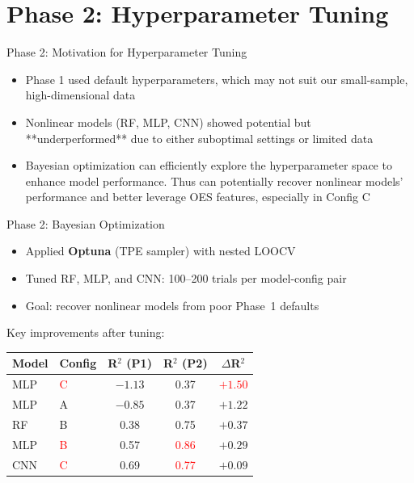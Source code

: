 \documentclass{libs/XJTLU_format}
\begin{document}
\section{Phase 2: Hyperparameter Tuning}
\begin{frame}{Phase 2: Motivation for Hyperparameter Tuning}
    \begin{itemize}
        \item Phase 1 used default hyperparameters, which may not suit our small-sample, high-dimensional data
        \item Nonlinear models (RF, MLP, CNN) showed potential but **underperformed** due to either suboptimal settings or limited data
        \item Bayesian optimization can efficiently explore the hyperparameter space to enhance model performance. Thus can potentially recover nonlinear models' performance and better leverage OES features, especially in Config C
    \end{itemize}
    
\end{frame}

\begin{frame}{Phase 2: Bayesian Optimization}
    \begin{itemize}
        \item Applied \textbf{Optuna} (TPE sampler) with nested LOOCV
        \item Tuned RF, MLP, and CNN: 100--200 trials per model-config pair
        \item Goal: recover nonlinear models from poor Phase~1 defaults
    \end{itemize}
    \vspace{0.5em}
    Key improvements after tuning:
    \begin{table}[h]
        \centering
        \small
        \begin{tabular}{@{}llccc@{}}
            \toprule
            \textbf{Model} & \textbf{Config} & \textbf{R$^2$ (P1)} & \textbf{R$^2$ (P2)} & \textbf{$\Delta$R$^2$} \\
            \midrule
            MLP & \textcolor{red}{C} & $-1.13$ & 0.37 & \textcolor{red}{$+1.50$} \\
            MLP & A & $-0.85$ & 0.37 & $+1.22$ \\
            RF  & B & 0.38 & 0.75 & $+0.37$ \\
            MLP & \textcolor{red}{B} & 0.57 & \textcolor{red}{0.86} & $+0.29$ \\
            CNN & \textcolor{red}{C} & 0.69 & \textcolor{red}{0.77} & $+0.09$ \\
            \bottomrule
        \end{tabular}
    \end{table}
\end{frame}
\end{document}
